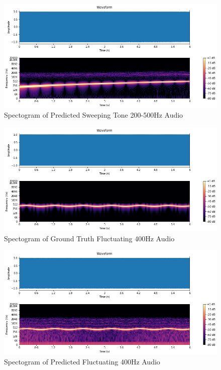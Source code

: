 \documentclass{ioereport}
\begin{document}
    \begin{figure}[H]
        \centering
        \includegraphics[width=\linewidth]{assets/audio_results/sweeping_tone200-500hzpred.png}
        \caption{Spectogram of Predicted Sweeping Tone 200-500Hz Audio}
        \label{fig:pred-sweep200-500-spec}
    \end{figure}

    \begin{figure}[H]
        \centering
        \includegraphics[width=\linewidth]{assets/audio_results/fluctuating_tone400.png}
        \caption{Spectogram of Ground Truth Fluctuating 400Hz Audio}
        \label{fig:gt-fluc400-spec}
    \end{figure}
    
    \begin{figure}[H]
        \centering
        \includegraphics[width=\linewidth]{assets/audio_results/fluctuating_tone400pred.png}
        \caption{Spectogram of Predicted Fluctuating 400Hz Audio}
        \label{fig:pred-fluc400-spec}
    \end{figure}
\end{document}
